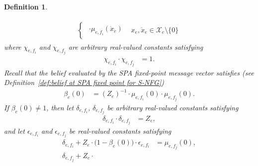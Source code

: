 \documentclass[journal]{IEEEtran}
\newcommand{\add}[1]{{\color{black}#1}}
\newtheorem{definition}[theorem]{Definition}
\newcommand{\set}[1]{\mathcal{#1}}
\newcommand{\beli}{\beta}
\newcommand{\LCT}[1]{ \mathring{#1} }
\newcommand{\efi}{ e,f_i }
\newcommand{\efj}{ e,f_j }
\begin{document}
\begin{definition}
\begin{enumerate}
\begin{itemize}
\begin{align}
\begin{aligned}
\begin{cases}
\begin{array}{l}
                                  \cdot
                                  \mu_{\efi}(\LCT{x}_e)
                                \end{array}
                                 & \!\!\!\!\!\!\!\! x_e,\LCT{x}_e \in \set{X}_e \setminus \{ 0 \}
                              \end{cases}
                    \end{aligned}
                  \end{align}
                  where $\chi_{\efi}$ and $\chi_{\efj}$ are \add{arbitrary} real-valued constants satisfying
                  \begin{align}
                    \chi_{\efi}
                    \cdot
                    \chi_{\efj}
                     & = 1.
                    \label{sec:LCT:exp:6}
                  \end{align}
                  \add{Recall that the belief evaluated by the SPA fixed-point
                    message vector satisfies (see Definition~\ref{def:belief at
                      SPA fixed point for S-NFG})
                    \begin{align}
                      \beli_e(0)
                       & = (Z_e)^{-1} \cdot \mu_{\efi}(0) \cdot \mu_{\efj}(0).
                      \label{sec:LCT:exp:new:2}
                    \end{align}
                    If $ \beli_e(0) \neq 1 $, then let $\delta_{\efi}$,
                    $\delta_{\efj}$ be \add{arbitrary} real-valued constants
                    satisfying
                    \begin{align}
                      \delta_{\efi}
                      \cdot
                      \delta_{\efj}
                       & = Z_e,
                      \label{sec:LCT:exp:7}
                    \end{align}
                    and let $\epsilon_{\efi}$ and $\epsilon_{\efj}$ be
                    real-valued constants satisfying
                    \begin{align}
                      \delta_{\efi}
                      +
                      Z_e
                      \cdot
                      \bigl( 1 \! - \! \beli_e(0) \bigr)
                      \cdot
                      \epsilon_{\efi}
                       & = \mu_{\efj}(0),
                      \label{sec:LCT:exp:8} \\
                      \delta_{\efj}
                      +
                      Z_e
                      \cdot

\end{align}}
\end{itemize}
\end{enumerate}
\end{definition}
\end{document}
